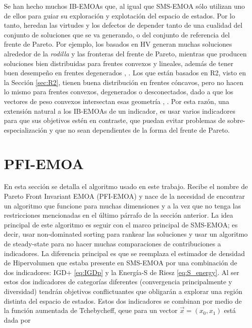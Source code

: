 Se han hecho muchos IB-EMOAs que, al igual que SMS-EMOA sólo utilizan uno de ellos para guiar su exploración y explotación del espacio de estados. Por lo tanto, heredan las virtudes y los defectos de depender tanto de una cualidad del conjunto de soluciones que se va generando, o del conjunto de referencia del frente de Pareto. Por ejemplo, los basados en HV generan muchas soluciones alrededor de la \emph{rodilla} y las fronteras del frente de Pareto, mientras que producen soluciones bien distribuidas para frentes convexos y lineales, además de tener buen desempeño en frentes degenerados \cite{HV_reference}, \cite{SMS-EMOA}. Los que están basados en R2, visto en la Sección \ref{sec:R2}, tienen buena distribución en frentes cóncavos, pero no hacen lo mismo para frentes convexos, degenerados o desconectados, dado a que los vectores de peso convexos intersectan esas geometría \cite{performance_pareto_front}, \cite{R2-EMOA}. Por esta razón, una extensión natural a los IB-EMOAs de un indicador, es usar varios indicadores para que sus objetivos estén en contraste, que puedan evitar problemas de sobre-especialización y que no sean dependientes de la forma del frente de Pareto.  

\section{PFI-EMOA} \label{sec:PFI-EMOA}

En esta sección se detalla el algoritmo usado en este trabajo. Recibe el nombre de Pareto Front Invariant EMOA (PFI-EMOA) y nace de la necesidad de encontrar un algoritmo que funcione para muchas dimensiones y a la vez que no tenga las restricciones mencionadas en el último párrafo de la sección anterior. La idea principal de este algoritmo es seguir con el marco principal de SMS-EMOA; es decir, usar non-dominated sorting para rankear las soluciones y usar un algoritmo de steady-state para no hacer muchas comparaciones de contribuciones a indicadores. La diferencia principal es que se reemplaza el estimador de densidad de Hipervolumen que estaba presente en SMS-EMOA por una combinación de dos indicadores: IGD+ \eqref{eq:IGDp} y la Energía-S de Riesz \eqref{eq:S_energy}. Al ser estos dos indicadores de categorías diferentes (convergencia principalmente y diversidad) tendrán objetivos conflictuantes que obligarán a explorar una región distinta del espacio de estados. Estos dos indicadores se combinan por medio de la función aumentada de Tchebycheff,  qeue para un vector $\vec{x}=(x_0,x_1)$ está dada por


